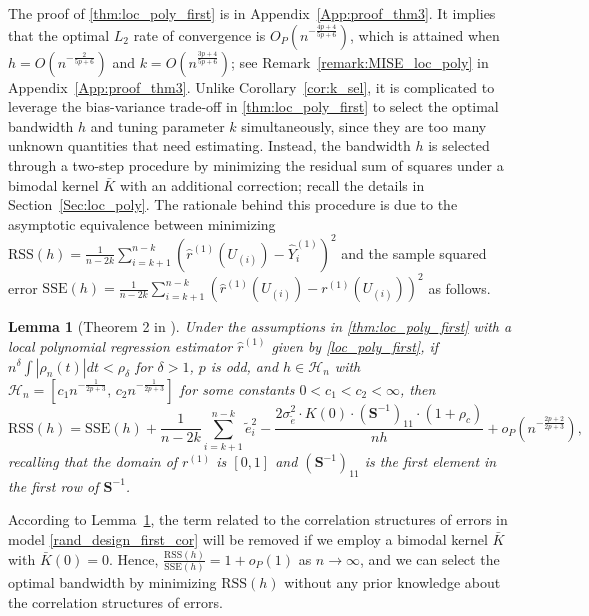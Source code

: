 \documentclass{uwstat572}
\newtheorem{lemma}[theorem]{Lemma}
\theoremstyle{definition}
\renewcommand{\hat}{\widehat}
\renewcommand{\tilde}{\widetilde}
\theoremstyle{theorem}
\begin{document}
\noindent The proof of \autoref{thm:loc_poly_first} is in Appendix~\ref{App:proof_thm3}. It implies that the optimal $L_2$ rate of convergence is $O_P\left(n^{-\frac{4p+4}{5p+6}}\right)$, which is attained when $h=O\left(n^{-\frac{2}{5p+6}}\right)$ and $k=O\left(n^{\frac{3p+4}{5p+6}}\right)$; see Remark~\ref{remark:MISE_loc_poly} in Appendix~\ref{App:proof_thm3}. Unlike Corollary~\ref{cor:k_sel}, it is complicated to leverage the bias-variance trade-off in \autoref{thm:loc_poly_first} to select the optimal bandwidth $h$ and tuning parameter $k$ simultaneously, since they are too many unknown quantities that need estimating. Instead, the bandwidth $h$ is selected through a two-step procedure by minimizing the residual sum of squares under a bimodal kernel $\bar{K}$ with an additional correction; recall the details in Section~\ref{Sec:loc_poly}. The rationale behind this procedure is due to the asymptotic equivalence between minimizing $\mathrm{RSS}(h)=\frac{1}{n-2k} \sum_{i=k+1}^{n-k} \left(\hat{r}^{(1)}(U_{(i)}) -\hat{Y}_i^{(1)} \right)^2$ and the sample squared error $\mathrm{SSE}(h) = \frac{1}{n-2k} \sum_{i=k+1}^{n-k} \left(\hat{r}^{(1)}(U_{(i)}) -r^{(1)}(U_{(i)}) \right)^2$ as follows.

\begin{lemma}[Theorem 2 in \citealt{de2018local}]
\label{lem:RSS_SSE}
Under the assumptions in \autoref{thm:loc_poly_first} with a local polynomial regression estimator $\hat{r}^{(1)}$ given by \eqref{loc_poly_first}, if $n^{\delta} \int |\rho_n(t)| dt < \rho_{\delta}$ for $\delta >1$, $p$ is odd, and $h\in \mathcal{H}_n$ with $\mathcal{H}_n=\left[c_1 n^{-\frac{1}{2p+3}},\, c_2 n^{-\frac{1}{2p+3}}\right]$ for some constants $0<c_1<c_2<\infty$, then
$$\mathrm{RSS}(h) = \mathrm{SSE}(h) + \frac{1}{n-2k} \sum_{i=k+1}^{n-k} \tilde{e}_i^2 - \frac{2\sigma_{\tilde{e}}^2\cdot K(0) \cdot \left(\bm{S}^{-1}\right)_{11}\cdot(1 +\rho_c)}{nh} + o_P\left(n^{-\frac{2p+2}{2p+3}}\right),$$
recalling that the domain of $r^{(1)}$ is $[0,1]$ and $\left(\bm{S}^{-1}\right)_{11}$ is the first element in the first row of $\bm{S}^{-1}$.
\end{lemma}

\noindent According to Lemma~\ref{lem:RSS_SSE}, the term related to the correlation structures of errors in model \eqref{rand_design_first_cor} will be removed if we employ a bimodal kernel $\bar{K}$ with $\bar{K}(0)=0$. Hence, $\frac{\mathrm{RSS}(h)}{\mathrm{SSE}(h)} = 1+o_P(1)$ as $n\to\infty$, and we can select the optimal bandwidth by minimizing $\mathrm{RSS}(h)$ without any prior knowledge about the correlation structures of errors.
\end{document}

